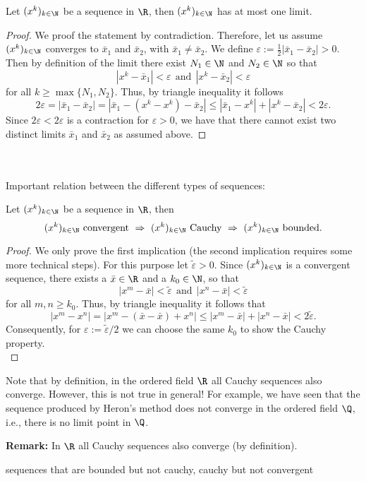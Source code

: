 \begin{frame} 
\begin{theo}
	Let $(x^k)_{k\in \N}$ be a sequence in $\R$, then $(x^k)_{k\in \N}$ has at most one limit.
\end{theo}
\begin{proof} \blank
	We proof the statement by contradiction. Therefore, let us assume $(x^k)_{k\in \N}$ converges to $\bar{x}_1$ and $\bar{x}_2$, with $\bar{x}_1\neq \bar{x}_2$. We define $\varepsilon := \frac{1}{2}|\bar{x}_1- \bar{x}_2|>0$. Then by definition of the limit there exist $N_1\in\N$ and $N_2\in\N$ so that
	$$|x^k-\bar{x}_1| <  \varepsilon~~\text{and}~~|x^k-\bar{x}_2| <  \varepsilon$$
	for all $k \geq \max\{N_1,N_2\}$. Thus, by triangle inequality it follows
	$$2\varepsilon= |\bar{x}_1- \bar{x}_2| =  |\bar{x}_1- (x^k-x^k) -\bar{x}_2| \leq |\bar{x}_1-  x^k|+|x^k- \bar{x}_2| < 2\varepsilon.$$
	Since $2\varepsilon< 2\varepsilon$ is a contraction for $\varepsilon>0$, we have that there cannot exist two distinct limits $\bar{x}_1$ and $\bar{x}_2$ as assumed above.
\end{proof}
~\\~\\
Important relation between the different types of sequences:
\begin{theo}\label{theo:relation_conv_cauchy_bound}
	Let $(x^k)_{k\in \N}$ be a sequence in $\R$, then 
	$$(x^k)_{k\in \N}~\text{convergent}~\Rightarrow~(x^k)_{k\in \N}~\text{Cauchy}~\Rightarrow~(x^k)_{k\in \N}~\text{bounded}.$$
\end{theo}\vspace{0.4cm}
\begin{proof}\blank
	We only prove the first implication (the second implication requires some more technical steps). For this purpose let $\tilde{\varepsilon} > 0$. Since $(x^k)_{k\in \N}$ is a convergent sequence, there exists a $\bar{x}\in \R$ and a $k_0 \in \N$, so that
	$$|x^m-\bar{x}| <  \tilde{\varepsilon} ~~\text{and}~~|x^n-\bar{x}| <  \tilde{\varepsilon}$$
	for all $m,n \geq k_0$. Thus, by triangle inequality it follows that
	$$|x^m-x^n| = |x^m-(\bar{x}-\bar{x})+x^n| \leq |x^m-\bar{x}| + |x^n-\bar{x}| < 2\tilde{\varepsilon}.$$ Consequently, for $\varepsilon:= {\tilde{\varepsilon}}/{2}$ we can choose the same $k_0$ to show the Cauchy property.\\
\end{proof} 
\begin{re}
	Note that by definition, in the ordered field $\R$ all Cauchy sequences also converge. However, this is not true in general! For example, we have seen that the sequence produced by Heron's method does not converge in the ordered field $\Q$, i.e., there is no limit point in $\Q$.
\end{re}
\textbf{Remark:} In $\R$ all Cauchy sequences also converge (by definition).
\vspace{2.4cm}
\begin{ex}
	\blank
	sequences that are bounded but not cauchy, cauchy but not convergent
\end{ex}
 \end{frame}


